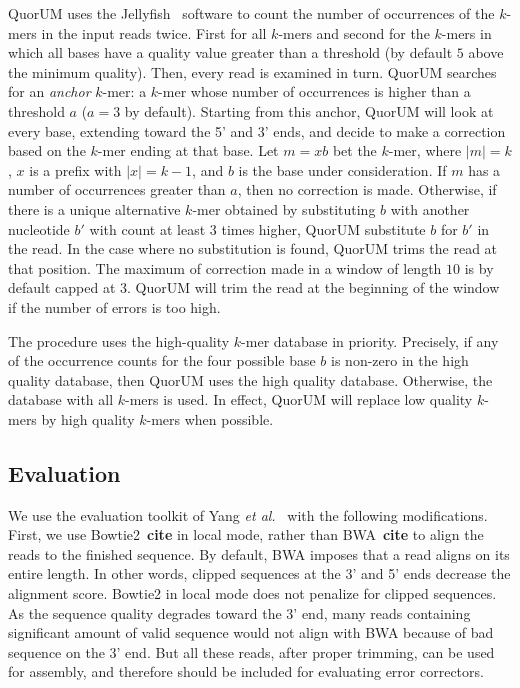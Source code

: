 \documentclass[10pt]{bmc_article}
\newenvironment{bmcformat}{\fussy\setboolean{publ}{true}}{\fussy}
\begin{document}
\begin{bmcformat}
QuorUM uses the Jellyfish~\cite{Marcais2011} software to count the number of occurrences of the $k$-mers in the input reads twice.
First for all $k$-mers and second for the $k$-mers in which all bases have a quality value greater than a threshold (by default $5$ above the minimum quality).
Then, every read is examined in turn.
QuorUM searches for an \emph{anchor} $k$-mer: a $k$-mer whose number of occurrences is higher than a threshold $a$ ($a = 3$ by default). 
Starting from this anchor, QuorUM will look at every base, extending toward the 5' and 3' ends, and decide to make a correction based on the $k$-mer ending at that base.
Let $m = xb$ bet the $k$-mer, where $|m| = k$, $x$ is a prefix with $|x| = k - 1$, and $b$ is the base under consideration.
If $m$ has a number of occurrences greater than $a$, then no correction is made.
Otherwise, if there is a unique alternative $k$-mer obtained by substituting $b$ with another nucleotide $b'$ with count at least $3$ times higher, QuorUM substitute $b$ for $b'$ in the read.
In the case where no substitution is found, QuorUM trims the read at that position.
The maximum of correction made in a window of length $10$ is by default capped at $3$.
QuorUM will trim the read at the beginning of the window if the number of errors is too high.

The procedure uses the high-quality $k$-mer database in priority.
Precisely, if any of the occurrence counts for the four possible base $b$ is non-zero in the high quality database, then QuorUM uses the high quality database.
Otherwise, the database with all $k$-mers is used.
In effect, QuorUM will replace low quality $k$-mers by high quality $k$-mers when possible.

\subsection*{Evaluation}

We use the evaluation toolkit of Yang \emph{et al.}~\cite{Yang2012} with the following modifications.
First, we use Bowtie2~{\bf cite} in local mode, rather than BWA~{\bf cite} to align the reads to the finished sequence.
By default, BWA imposes that a read aligns on its entire length.
In other words, clipped sequences at the 3' and 5' ends decrease the alignment score.
Bowtie2 in local mode does not penalize for clipped sequences.
As the sequence quality degrades toward the 3' end, many reads containing significant amount of valid sequence would not align with BWA because of bad sequence on the 3' end.
But all these reads, after proper trimming, can be used for assembly, and therefore should be included for evaluating error correctors.


\end{bmcformat}
\end{document}
